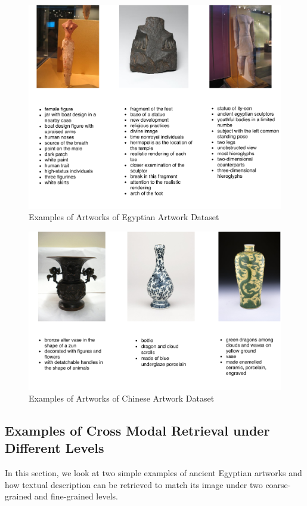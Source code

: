 \begin{figure}[h!]
\centering
\includegraphics[width=.8\textwidth]{egyptian.pdf}
\caption{Examples of Artworks of Egyptian Artwork Dataset}
\label{fig:sampleEgyptian}
\end{figure}

\begin{figure}[h!]
\centering
\includegraphics[width=.9\textwidth]{chinese.pdf}
\caption{Examples of Artworks of Chinese Artwork Dataset}
\label{fig:sampleChinese}
\end{figure}

\subsection{Examples of Cross Modal Retrieval under Different Levels}
In this section, we look at two simple examples of ancient Egyptian artworks and how textual description can be retrieved to match its image under two coarse-grained and fine-grained levels.

